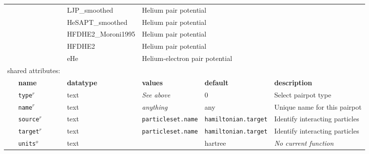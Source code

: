 \begin{table}[h]
\begin{center}
\begin{tabularx}{\textwidth}{l l l l l l }
\multicolumn{2}{l}{                } & LJP\_smoothed      & \multicolumn{3}{l}{Helium pair potential}\\
\multicolumn{2}{l}{                } & HeSAPT\_smoothed   & \multicolumn{3}{l}{Helium pair potential}\\
\multicolumn{2}{l}{                } & HFDHE2\_Moroni1995 & \multicolumn{3}{l}{Helium pair potential}\\
\multicolumn{2}{l}{                } & HFDHE2             & \multicolumn{3}{l}{Helium pair potential}\\
\multicolumn{2}{l}{                } & eHe                & \multicolumn{3}{l}{Helium-electron pair potential}\\
\multicolumn{2}{l}{shared attributes:} & \multicolumn{4}{l}{}\\
   &   \bfseries name     & \bfseries datatype & \bfseries values & \bfseries default   & \bfseries description \\
   &   \texttt{type}$^r$      &  text              & \textit{See above}        & 0                   & Select pairpot type         \\
   &   \texttt{name}$^r$      &  text              & \textit{anything}         & any                 & Unique name for this pairpot\\
   &   \texttt{source}$^r$    &  text              & \texttt{particleset.name} &\texttt{hamiltonian.target}& Identify interacting particles\\
   &   \texttt{target}$^r$    &  text              & \texttt{particleset.name} &\texttt{hamiltonian.target}& Identify interacting particles  \\
   &   \texttt{units}$^o$     &  text              &                           & hartree             & \textit{No current function}  \\
\hline
\end{tabularx}
\end{center}
\end{table}
\FloatBarrier

